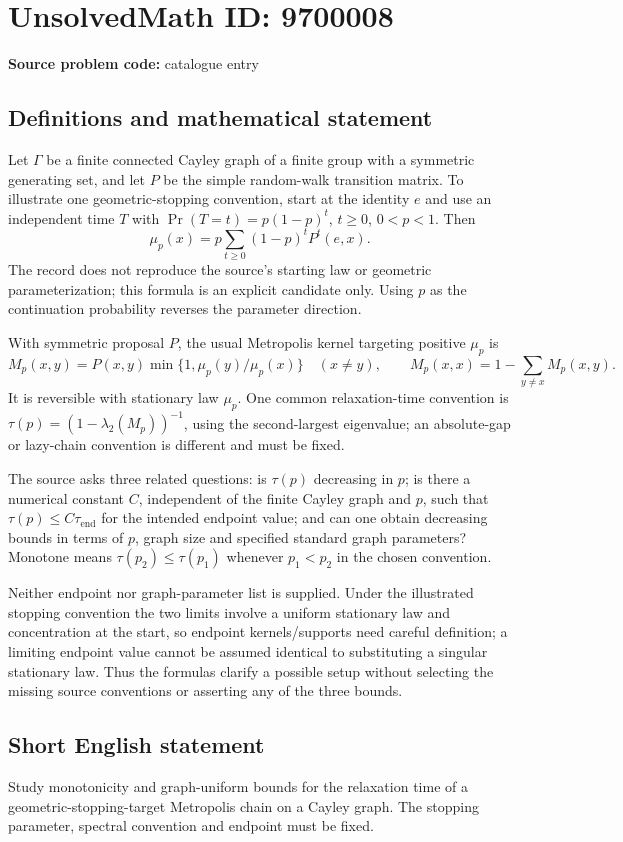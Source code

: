\documentclass[11pt]{article}
\begin{document}
\section*{UnsolvedMath ID: 9700008}
\textbf{Source problem code:} catalogue entry
\subsection{Definitions and mathematical statement}
Let $\Gamma$ be a finite connected Cayley graph of a finite group with a symmetric generating set, and let $P$ be the simple random-walk transition matrix. To illustrate one geometric-stopping convention, start at the identity $e$ and use an independent time $T$ with $\Pr(T=t)=p(1-p)^t$, $t\geq0$, $0<p<1$. Then
\[
\mu_p(x)=p\sum_{t\geq0}(1-p)^tP^t(e,x).
\]
The record does not reproduce the source's starting law or geometric parameterization; this formula is an explicit candidate only. Using $p$ as the continuation probability reverses the parameter direction.

With symmetric proposal $P$, the usual Metropolis kernel targeting positive $\mu_p$ is
\[
M_p(x,y)=P(x,y)\min\{1,\mu_p(y)/\mu_p(x)\}\quad(x\ne y),
\qquad M_p(x,x)=1-\sum_{y\ne x}M_p(x,y).
\]
It is reversible with stationary law $\mu_p$. One common relaxation-time convention is $\tau(p)=(1-\lambda_2(M_p))^{-1}$, using the second-largest eigenvalue; an absolute-gap or lazy-chain convention is different and must be fixed.

The source asks three related questions: is $\tau(p)$ decreasing in $p$; is there a numerical constant $C$, independent of the finite Cayley graph and $p$, such that $\tau(p)\leq C\tau_{\mathrm{end}}$ for the intended endpoint value; and can one obtain decreasing bounds in terms of $p$, graph size and specified standard graph parameters? Monotone means $\tau(p_2)\leq\tau(p_1)$ whenever $p_1<p_2$ in the chosen convention.

Neither endpoint nor graph-parameter list is supplied. Under the illustrated stopping convention the two limits involve a uniform stationary law and concentration at the start, so endpoint kernels/supports need careful definition; a limiting endpoint value cannot be assumed identical to substituting a singular stationary law. Thus the formulas clarify a possible setup without selecting the missing source conventions or asserting any of the three bounds.
\subsection{Short English statement}
Study monotonicity and graph-uniform bounds for the relaxation time of a geometric-stopping-target Metropolis chain on a Cayley graph. The stopping parameter, spectral convention and endpoint must be fixed.
\end{document}
